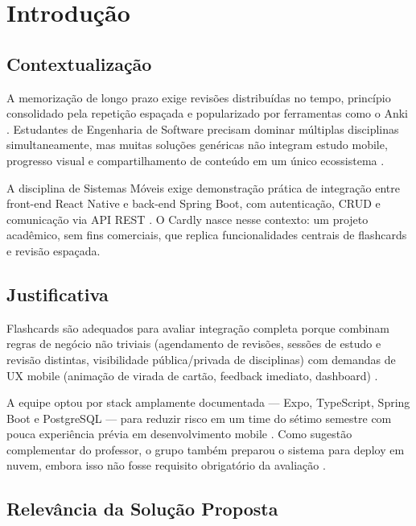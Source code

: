\chapter{Introdução}
\label{cap:introducao}

\section{Contextualização}

A memorização de longo prazo exige revisões distribuídas no tempo, princípio consolidado pela repetição espaçada e popularizado por ferramentas como o Anki \cite{anki_manual,anki_sm2}. Estudantes de Engenharia de Software precisam dominar múltiplas disciplinas simultaneamente, mas muitas soluções genéricas não integram estudo mobile, progresso visual e compartilhamento de conteúdo em um único ecossistema \cite{pressman2020,sommerville2019}.

A disciplina de Sistemas Móveis exige demonstração prática de integração entre front-end React Native e back-end Spring Boot, com autenticação, CRUD e comunicação via API REST \cite{react_native_docs,spring_boot_docs,tanenbaum2015}. O Cardly nasce nesse contexto: um projeto acadêmico, sem fins comerciais, que replica funcionalidades centrais de flashcards e revisão espaçada.

\section{Justificativa}

Flashcards são adequados para avaliar integração completa porque combinam regras de negócio não triviais (agendamento de revisões, sessões de estudo e revisão distintas, visibilidade pública/privada de disciplinas) com demandas de UX mobile (animação de virada de cartão, feedback imediato, dashboard) \cite{anki_manual,medium_spaced_repetition,w3schools_flip}.

A equipe optou por stack amplamente documentada --- Expo, TypeScript, Spring Boot e PostgreSQL --- para reduzir risco em um time do sétimo semestre com pouca experiência prévia em desenvolvimento mobile \cite{expo_docs,youtube_expo_typescript,stackoverflow_jwt_spring}. Como sugestão complementar do professor, o grupo também preparou o sistema para deploy em nuvem, embora isso não fosse requisito obrigatório da avaliação \cite{twelve_factor}.

\section{Relevância da Solução Proposta}

